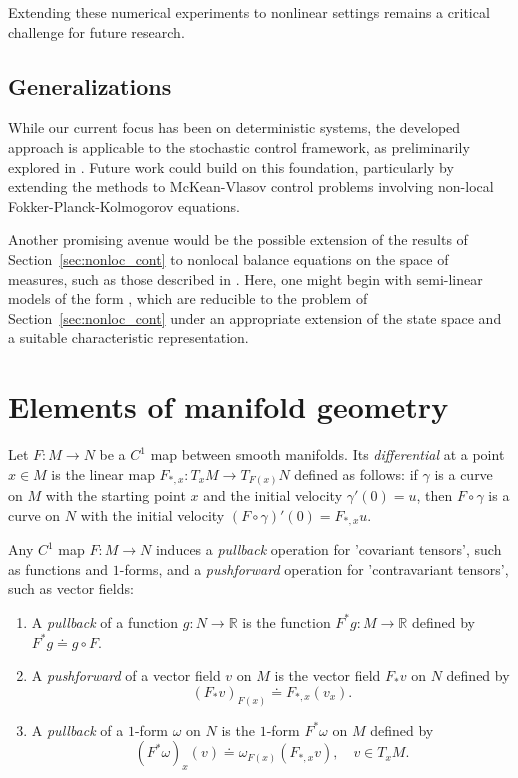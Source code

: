 \documentclass[sn-mathphys-num]{sn-jnl}
\numberwithin{equation}{section}
\theoremstyle{mythm}
\theoremstyle{mydef}
\begin{document}
Extending these numerical experiments to nonlinear settings remains a critical challenge for future research.

\subsection{Generalizations}

While our current focus has been on deterministic systems, the developed approach is applicable to the stochastic control framework, as preliminarily explored in \cite{chertovskihOptimalControlDiffusion2024}. Future work could build on this foundation, particularly by extending the methods to McKean-Vlasov control problems involving non-local Fokker-Planck-Kolmogorov equations.

Another promising avenue would be the possible extension of the results of Section~\ref{sec:nonloc_cont} to nonlocal balance equations on the space of measures, such as those described in \cite{pogodaevNonlocalBalanceEquations2022}. Here, one might begin with semi-linear models of the form \cite{Averboukh2024}, which are reducible to the problem of Section~\ref{sec:nonloc_cont} under an appropriate extension of the state space and a suitable characteristic representation. 

\appendix



\section{Elements of manifold geometry}
\label{app:geom}


  Let \( F \colon M \to N \) be a \( C^{1} \) map between smooth manifolds.
  Its \emph{differential} at a point \( x\in M \) is the linear map \( F_{*,x}\colon T_xM \to T_{F(x)}N \) defined as follows: if \( \gamma \) is a curve on \( M \) with the starting point \( x \) and the initial velocity \( \gamma'(0)=u \), then \( F\circ \gamma \) is a curve on \( N \) with the initial velocity \( (F\circ \gamma)'(0) = F_{*,x}u \).

Any \( C^1 \) map \( F \colon M \to N \) induces a \emph{pullback} operation for 'covariant tensors', such as functions and \( 1 \)-forms, and a \emph{pushforward} operation for 'contravariant tensors', such as vector fields:
  \begin{enumerate}[1)]
    \item A \emph{pullback} of a function \( g\colon N \to \mathbb{R}\) is the function \( F^{*}g\colon M\to \mathbb{R} \) defined by \( F^{*}g\doteq g\circ F \).
    \item A \emph{pushforward} of a vector field \( v \) on \( M \) is the vector field \( F_{*}v \) on \( N \) defined by
    \[
    (F_{*}v)_{F(x)} \doteq F_{*,x}(v_{x}).
    \]

    \item A \emph{pullback} of a \( 1 \)-form \( \omega \) on \( N \) is the \( 1 \)-form \( F^{*}\omega \) on \( M \) defined by
  \[
    (F^{*}\omega)_x(v) \doteq \omega_{F(x)}(F_{*,x}v), \quad v\in T_xM.
  \]
  \end{enumerate}
\end{document}
